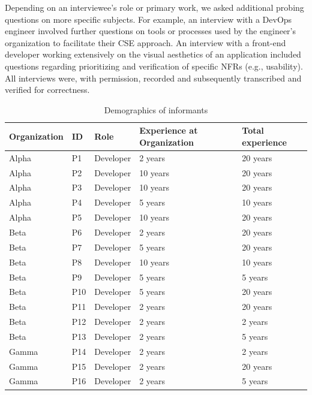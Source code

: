 \documentclass[smallextended]{svjour3}        %
\providecommand{\DIFaddend}{} %
\DeclareRobustCommand{\DIFaddend}{\DIFOaddend \let\includegraphics\DIFOincludegraphics} %
\begin{document}
\DIFaddend Depending on an interviewee's role or primary work, we asked additional probing questions on more specific subjects. 
For example, an interview with a DevOps engineer involved further questions on tools or processes used by the engineer's organization to facilitate their CSE approach. 
An interview with a front-end developer working extensively on the visual aesthetics of an application included questions regarding prioritizing and verification of specific NFRs (e.g., usability).
All interviews were, with permission, recorded and subsequently transcribed and verified for correctness.

\begin{table}[!h]
\footnotesize
    \centering
    \caption{Demographics of informants}
    \label{tab:informants}
    \begin{tabular}{p{1.5cm}p{0.6cm}p{2.5cm}p{3.5cm}p{2cm}}
\toprule
Organization & ID & Role & Experience at Organization & Total experience\\
\midrule 
Alpha & P1 & Developer & 2 years & 20 years\\
Alpha & P2 & Developer & 10 years & 20 years\\
Alpha & P3 & Developer & 10 years & 20 years\\
Alpha & P4 & Developer & 5 years & 10 years\\
Alpha & P5 & Developer & 10 years & 20 years\\
Beta & P6 & Developer & 2 years & 20 years\\
Beta  & P7 & Developer & 5 years & 20 years\\
Beta  & P8 & Developer & 10 years & 10 years\\
Beta & P9 & Developer & 5 years & 5 years\\
Beta & P10 & Developer & 5 years & 20 years\\
Beta & P11 & Developer & 2 years & 20 years\\
Beta & P12 & Developer & 2 years & 2 years\\
Beta & P13 & Developer & 2 years & 5 years\\
Gamma & P14 & Developer & 2 years & 2 years\\
Gamma & P15 & Developer & 2 years & 20 years\\
Gamma & P16 & Developer & 2 years & 5 years\\

\end{tabular}
\end{table}
\end{document}
